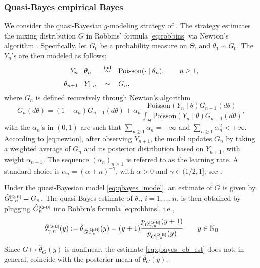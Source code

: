 \documentclass[twoside,12pt]{article}
\def\simind{\stackrel{\mbox{\scriptsize{ind}}}{\sim}}
\begin{document}
\subsubsection{Quasi-Bayes empirical Bayes}

We consider the quasi-Bayesian $g$-modeling strategy of \citet{Fav(24)}. The strategy estimates the mixing distribution $G$ in Robbins' formula \eqref{eq:robbins} via Newton's algorithm \citep{New(98)}. Specifically, let $G_{0}$ be a probability measure on $\Theta$, and $\theta_{1}\sim G_{0}$. The $Y_{n}$'s are then modeled as follows:
\begin{equation}\label{eq:qbayes_model}
\begin{array}{r@{\;}c@{\;}l@{\quad}c@{\quad}l}
Y_n& \mid &\theta_n& \simind &\mathrm{Poisson}(\cdot\mid \theta_n),\qquad n\geq 1,\\[0.2cm]
\theta_{n+1}& \mid &Y_{1:n}& \sim &G_n,
\end{array}
\end{equation}
where $G_{n}$ is defined recursively through Newton's algorithm
\begin{equation}\label{eq:newton}
G_{n}(d\theta)=(1-\alpha_{n})G_{n-1}(d\theta)+\alpha_{n}\frac{\text{Poisson}(Y_{n}\mid\theta)G_{n-1}(d\theta)}{\int_\Theta \text{Poisson}(Y_{n}\mid\theta)G_{n-1}(d\theta)},
\end{equation}
with the $\alpha_{n}$'s in $(0,1)$ are such that  $\sum_{n\geq1}\alpha_{n}=+\infty$ and $\sum_{n\geq1}\alpha^{2}_{n}<+\infty$. According to \eqref{eq:newton}, after observing \(Y_{n+1}\), the model updates \(G_n\) by taking a weighted average of \(G_n\) and its posterior distribution based on \(Y_{n+1}\), with weight \(\alpha_{n+1}\). The sequence $(\alpha_{n})_{n\geq1}$ is referred to as the learning rate. A standard choice is $\alpha_{n}=(\alpha+n)^{-\gamma}$, with $\alpha>0$ and $\gamma\in (1/2,1]$; see \citet{For(20)}.

Under the quasi-Bayesian model \eqref{eq:qbayes_model}, an estimate of $G$ is given by $\hat{G}_{\gamma,n}^{\text{\tiny{[Q-B]}}}=G_{n}$. The quasi-Bayes estimate of $\theta_{i}$, $i=1,\ldots,n$, is then obtained by plugging $\hat{G}_{n}^{\text{\tiny{[Q-B]}}}$ into Robbin's formula \eqref{eq:robbins}, i.e., 
\begin{equation}\label{eq:qbayes_eb_est}
\hat{\theta}^{\text{\tiny{[Q-B]}}}_{\gamma,n}(y):=\hat{\theta}_{\hat{G}_{\gamma,n}^{\text{\tiny{[Q-B]}}}}(y)=(y+1)\frac{p_{\hat{G}_{\gamma,n}^{\text{\tiny{[Q-B]}}}}(y+1)}{p_{\hat{G}_{\gamma,n}^{\text{\tiny{[Q-B]}}}}(y)}\qquad y\in\mathbb{N}_{0}
\end{equation}
Since $G\mapsto \hat{\theta}_G(y)$ is nonlinear, the estimate \eqref{eq:qbayes_eb_est} does not, in general, coincide with the posterior mean of $\hat\theta_G(y)$.
\end{document}
